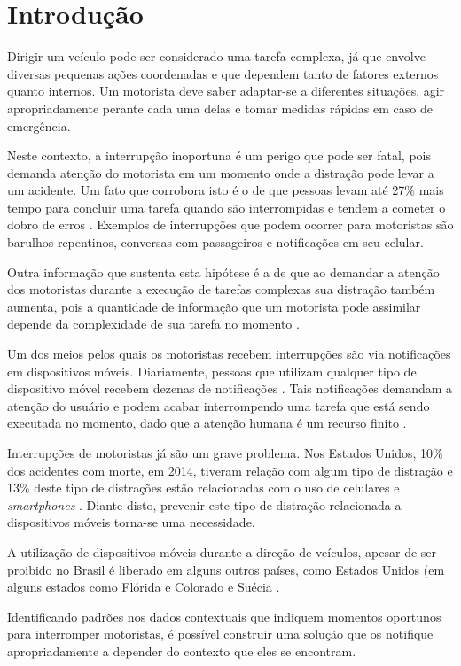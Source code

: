 \chapter{Introdução}
\label{introducao}

Dirigir um veículo pode ser considerado uma tarefa complexa, já que envolve diversas pequenas ações coordenadas e
que dependem tanto de fatores externos quanto internos. Um motorista deve saber adaptar-se a diferentes situações,
agir apropriadamente perante cada uma delas e tomar medidas rápidas em caso de emergência.

Neste contexto, a interrupção inoportuna é um perigo que pode ser fatal, pois demanda atenção do motorista em um momento
onde a distração pode levar a um acidente. Um fato que corrobora isto é o de que pessoas levam até 27\% mais tempo para
concluir uma tarefa quando são interrompidas e tendem a cometer o dobro de erros \cite{bailey2006need}. Exemplos de
interrupções que podem ocorrer para motoristas são barulhos repentinos, conversas com passageiros e notificações em
seu celular.

Outra informação que sustenta esta hipótese é a de que ao demandar a atenção dos motoristas durante a execução de
tarefas complexas sua distração também aumenta, pois a quantidade de informação que um motorista pode assimilar
depende da complexidade de sua tarefa no momento \cite{schneegass2013data}.

Um dos meios pelos quais os motoristas recebem interrupções são via notificações em dispositivos móveis.
Diariamente, pessoas que utilizam qualquer tipo de dispositivo móvel recebem dezenas de notificações
\cite{pielot2014situ}. Tais notificações demandam a atenção do usuário e podem acabar interrompendo uma tarefa que
está sendo executada no momento, dado que a atenção humana é um recurso finito \cite{simon1971designing}.

Interrupções de motoristas já são um grave problema. Nos Estados Unidos, 10\% dos acidentes com morte, em 2014, tiveram relação
com algum tipo de distração e 13\% deste tipo de distrações estão relacionadas com o uso de celulares e \textit{smartphones}
\cite{distracted2014}. Diante disto, prevenir este tipo de distração relacionada a dispositivos móveis torna-se uma necessidade.

A utilização de dispositivos móveis durante a direção de veículos, apesar de ser proibido no Brasil é liberado em alguns
outros países, como Estados Unidos (em alguns estados como Flórida e Colorado \cite{cellphoneuse, distracteddriving} e Suécia \cite{swedendrive}.

Identificando padrões nos dados contextuais que indiquem momentos oportunos para interromper motoristas, é possível
construir uma solução que os notifique apropriadamente a depender do contexto que eles se encontram.
